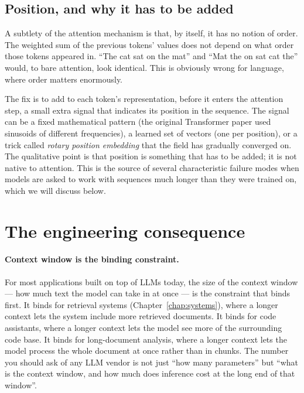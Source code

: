 \subsection*{Position, and why it has to be added}

A subtlety of the attention mechanism is that, by itself, it
has no notion of order. The weighted sum of the previous tokens'
values does not depend on what order those tokens appeared in.
``The cat sat on the mat'' and ``Mat the on sat cat the'' would,
to bare attention, look identical. This is obviously wrong for
language, where order matters enormously.

The fix is to add to each token's representation, before it
enters the attention step, a small extra signal that indicates
its position in the sequence. The signal can be a fixed
mathematical pattern (the original Transformer paper used
sinusoids of different frequencies), a learned set of vectors
(one per position), or a trick called \emph{rotary position
embedding} that the field has gradually converged on. The
qualitative point is that position is something that has to be
added; it is not native to attention. This is the source of
several characteristic failure modes when models are asked to
work with sequences much longer than they were trained on,
which we will discuss below.

\section{The engineering consequence}

\paragraph{Context window is the binding constraint.} For most
applications built on top of LLMs today, the size of the
context window --- how much text the model can take in at once
--- is the constraint that binds first. It binds for retrieval
systems (Chapter~\ref{chap:systems}), where a longer context lets the system
include more retrieved documents. It binds for code assistants,
where a longer context lets the model see more of the
surrounding code base. It binds for long-document analysis,
where a longer context lets the model process the whole
document at once rather than in chunks. The number you should
ask of any LLM vendor is not just ``how many parameters'' but
``what is the context window, and how much does inference cost
at the long end of that window''.


